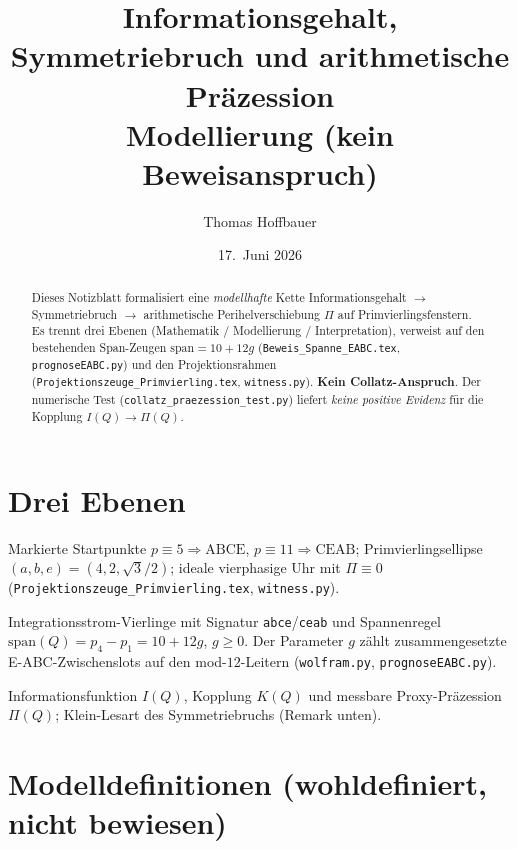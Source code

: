 \documentclass[11pt,a4paper]{article}
\title{Informationsgehalt, Symmetriebruch und arithmetische Präzession\\
  \large Modellierung (kein Beweisanspruch)}
\author{Thomas Hoffbauer}
\date{17.\ Juni 2026}
\theoremstyle{definition}
\theoremstyle{remark}
\begin{document}
\maketitle

\begin{abstract}
Dieses Notizblatt formalisiert eine \emph{modellhafte} Kette
Informationsgehalt $\to$ Symmetriebruch $\to$ arithmetische Perihelverschiebung
$\Pi$ auf Primvierlingsfenstern.
Es trennt drei Ebenen (Mathematik / Modellierung / Interpretation), verweist auf
den bestehenden Span-Zeugen $\mathrm{span}=10+12g$
(\texttt{Beweis\_Spanne\_EABC.tex}, \texttt{prognoseEABC.py}) und den
Projektionsrahmen (\texttt{Projektionszeuge\_Primvierling.tex},
\texttt{witness.py}).
\textbf{Kein Collatz-Anspruch}.
Der numerische Test (\texttt{collatz\_praezession\_test.py}) liefert
\emph{keine positive Evidenz} für die Kopplung $I(Q)\to\Pi(Q)$.
\end{abstract}

\section{Drei Ebenen}

\begin{description}[style=nextline,leftmargin=2.4cm]
  \item[\textbf{Ebene~A (fest)}]
  Markierte Startpunkte $p\equiv 5\Rightarrow\mathrm{ABCE}$,
  $p\equiv 11\Rightarrow\mathrm{CEAB}$; Primvierlingsellipse
  $(a,b,e)=(4,2,\sqrt{3}/2)$; ideale vierphasige Uhr mit $\Pi\equiv 0$
  (\texttt{Projektionszeuge\_Primvierling.tex}, \texttt{witness.py}).
  \item[\textbf{Ebene~B (Erweiterung)}]
  Integrationsstrom-Vierlinge mit Signatur \texttt{abce}/\texttt{ceab}
  und Spannenregel $\mathrm{span}(Q)=p_4-p_1=10+12g$, $g\geq 0$.
  Der Parameter $g$ zählt zusammengesetzte E-ABC-Zwischenslots auf den
  mod-$12$-Leitern (\texttt{wolfram.py}, \texttt{prognoseEABC.py}).
  \item[\textbf{Ebene~C (Modell)}]
  Informationsfunktion $I(Q)$, Kopplung $K(Q)$ und messbare Proxy-Präzession
  $\Pi(Q)$; Klein-Lesart des Symmetriebruchs (Remark unten).
\end{description}

\section{Modelldefinitionen (wohldefiniert, nicht bewiesen)}
\end{document}
